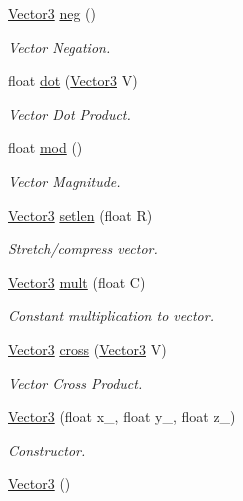 \begin{DoxyCompactItemize}
\item 
\hyperlink{class_vector3}{Vector3} \hyperlink{class_vector3_aa0e0f90a643143a76c9f940e6a728e77}{neg} ()
\begin{DoxyCompactList}\small\item\em Vector Negation. \end{DoxyCompactList}\item 
float \hyperlink{class_vector3_a8b2f8af40f833c9e35796f1def43368e}{dot} (\hyperlink{class_vector3}{Vector3} V)
\begin{DoxyCompactList}\small\item\em Vector Dot Product. \end{DoxyCompactList}\item 
float \hyperlink{class_vector3_a6d61644a84639dfa0be778973cf2c27a}{mod} ()
\begin{DoxyCompactList}\small\item\em Vector Magnitude. \end{DoxyCompactList}\item 
\hyperlink{class_vector3}{Vector3} \hyperlink{class_vector3_a507df97e1279faf0264412607e4c4f98}{setlen} (float R)
\begin{DoxyCompactList}\small\item\em Stretch/compress vector. \end{DoxyCompactList}\item 
\hyperlink{class_vector3}{Vector3} \hyperlink{class_vector3_a3570b78f36a016e9d41c86ac806a41b5}{mult} (float C)
\begin{DoxyCompactList}\small\item\em Constant multiplication to vector. \end{DoxyCompactList}\item 
\hyperlink{class_vector3}{Vector3} \hyperlink{class_vector3_aab0fd1ab901380762a159b2049f110e1}{cross} (\hyperlink{class_vector3}{Vector3} V)
\begin{DoxyCompactList}\small\item\em Vector Cross Product. \end{DoxyCompactList}\item 
\hyperlink{class_vector3_ad843eb49e7d4fce292ca66bbd835cfe5}{Vector3} (float x\+\_\+, float y\+\_\+, float z\+\_\+)
\begin{DoxyCompactList}\small\item\em Constructor. \end{DoxyCompactList}\item 
\hypertarget{class_vector3_a0f49191f7e001e7f7ae1cb49522118b4}{\hyperlink{class_vector3_a0f49191f7e001e7f7ae1cb49522118b4}{Vector3} ()}\label{class_vector3_a0f49191f7e001e7f7ae1cb49522118b4}


\end{DoxyCompactItemize}
